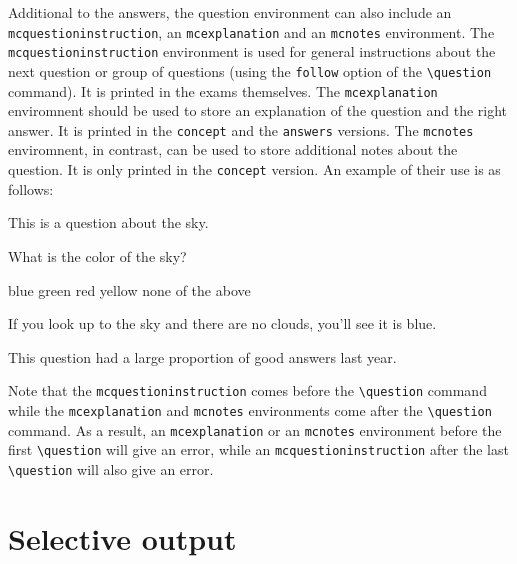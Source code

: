 \documentclass{article}
\begin{document}
Additional to the answers, the question environment can also include an \verb$mcquestioninstruction$, an \verb$mcexplanation$ and an \verb$mcnotes$ environment. The \verb$mcquestioninstruction$ environment is used for general instructions about the next question or group of questions (using the \verb$follow$ option of the \verb$\question$ command). It is printed in the exams themselves. The \verb$mcexplanation$ enviromnent should be used to store an explanation of the question and the right answer. It is printed in the \verb$concept$ and the \verb$answers$ versions. The \verb$mcnotes$ enviromnent, in contrast, can be used to store additional notes about the question. It is only printed in the \verb$concept$ version. An example of their use is as follows:
\begin{code}
\begin{mcquestioninstruction}
This is a question about the sky.
\end{mcquestioninstruction}

\question What is the color of the sky?
         
          \begin{mcanswerslist}[fixlast]
          \answer[4] blue
          \answer[-2] green
          \answer[1.5] red
          \answer[1] yellow
          \answer none of the above
          \end{mcanswerslist}        
  
          \begin{mcexplanation}
          If you look up to the sky and there are no clouds,
          you'll see it is blue.
          \end{mcexplanation}

          \begin{mcnotes}
          This question had a large proportion of good answers 
          last year.
          \end{mcnotes}
\end{code}

Note that the \verb$mcquestioninstruction$ comes before the \verb$\question$ command while the \verb$mcexplanation$ and \verb$mcnotes$ environments come after the \verb$\question$ command. As a result, an \verb$mcexplanation$ or an \verb$mcnotes$ environment before the first \verb$\question$ will give an error, while an \verb$mcquestioninstruction$ after the last \verb$\question$ will also give an error.




\section{Selective output}
\end{document}
